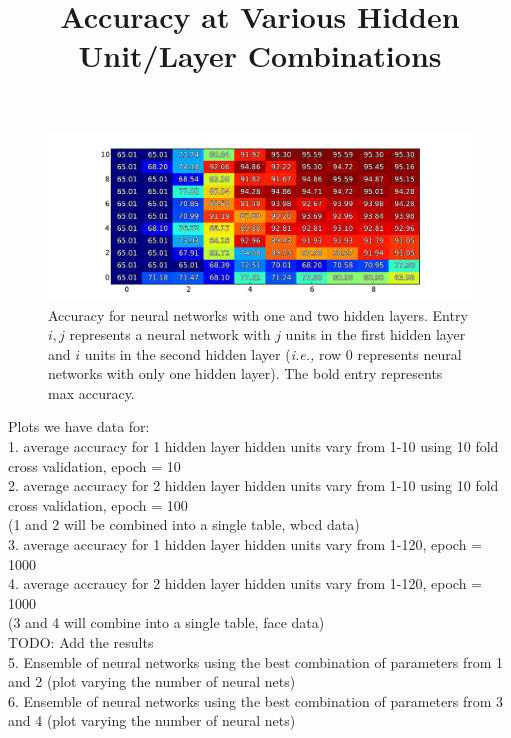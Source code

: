 \begin{figure}[t]
  \title{Accuracy at Various Hidden Unit/Layer Combinations}
\centering
\includegraphics[width=\textwidth]{figs/wbcd_table}
\caption {Accuracy for neural networks with one and two hidden layers. Entry \(i,j\) represents a neural network with \(j\) units in the first hidden layer and \(i\) units in the second hidden layer ({\em i.e.,} row 0 represents neural networks with only one hidden layer). The bold entry represents max accuracy.}

\label{fig:wbcd_table}

\end{figure}


Plots we have data for:\\
1. average accuracy for 1 hidden layer hidden units vary from 1-10 using 10 fold cross validation, epoch = 10\\
2. average accuracy for 2 hidden layer hidden units vary from 1-10 using 10 fold cross validation, epoch = 100\\
(1 and 2 will be combined into a single table, wbcd data)\\
3. average accuracy for 1 hidden layer hidden units vary from 1-120, epoch = 1000\\
4. average accraucy for 2 hidden layer hidden units vary from 1-120, epoch = 1000\\
(3 and 4 will combine into a single table, face data)\\

TODO: Add the results\\
5. Ensemble of neural networks using the best combination of parameters from 1 and 2 (plot varying the number of neural nets)\\
6. Ensemble of neural networks using the best combination of parameters from 3 and 4 (plot varying the number of neural nets)\\
 













